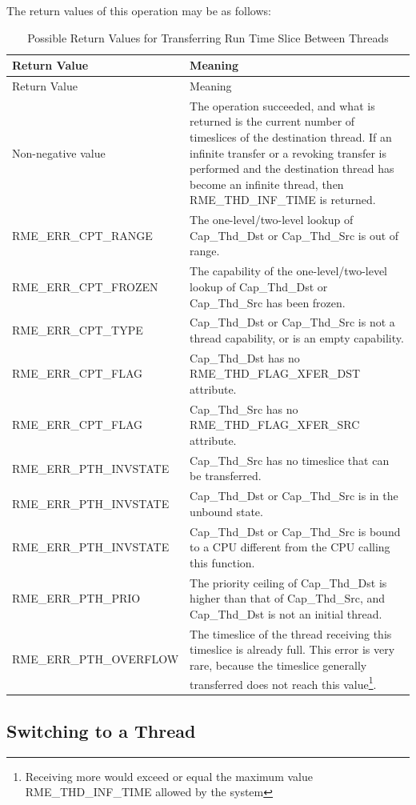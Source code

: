 The return values of this operation may be as follows:

\begin{xltabular}{\textwidth}{@{}>{\hsize\raggedright\arraybackslash}X>{\hsize\raggedright\arraybackslash}X@{}}
\caption{Possible Return Values for Transferring Run Time Slice Between Threads}\label{tab:4-35-transfer-run-time-slice-between-threads-return-values}\\
\toprule
Return Value & Meaning\tabularnewline
\endfirsthead
\toprule
Return Value & Meaning\tabularnewline
\midrule
\endhead
\bottomrule
\endlastfoot
    Non-negative value & The operation succeeded, and what is returned is the current number of timeslices of the destination thread. If an infinite transfer or a revoking transfer is performed and the destination thread has become an infinite thread, then RME\_THD\_INF\_TIME is returned.\tabularnewline
    RME\_ERR\_CPT\_RANGE & The one-level/two-level lookup of Cap\_Thd\_Dst or Cap\_Thd\_Src is out of range.\tabularnewline
    RME\_ERR\_CPT\_FROZEN & The capability of the one-level/two-level lookup of Cap\_Thd\_Dst or Cap\_Thd\_Src has been frozen.\tabularnewline
    RME\_ERR\_CPT\_TYPE & Cap\_Thd\_Dst or Cap\_Thd\_Src is not a thread capability, or is an empty capability.\tabularnewline
    RME\_ERR\_CPT\_FLAG & Cap\_Thd\_Dst has no RME\_THD\_FLAG\_XFER\_DST attribute.\tabularnewline
    RME\_ERR\_CPT\_FLAG & Cap\_Thd\_Src has no RME\_THD\_FLAG\_XFER\_SRC attribute.\tabularnewline
    RME\_ERR\_PTH\_INVSTATE & Cap\_Thd\_Src has no timeslice that can be transferred.\tabularnewline
    RME\_ERR\_PTH\_INVSTATE & Cap\_Thd\_Dst or Cap\_Thd\_Src is in the unbound state.\tabularnewline
    RME\_ERR\_PTH\_INVSTATE & Cap\_Thd\_Dst or Cap\_Thd\_Src is bound to a CPU different from the CPU calling this function.\tabularnewline
    RME\_ERR\_PTH\_PRIO & The priority ceiling of Cap\_Thd\_Dst is higher than that of Cap\_Thd\_Src, and Cap\_Thd\_Dst is not an initial thread.\tabularnewline
    RME\_ERR\_PTH\_OVERFLOW & The timeslice of the thread receiving this timeslice is already full. This error is very rare, because the timeslice generally transferred does not reach this value\footnote{Receiving more would exceed or equal the maximum value RME\_THD\_INF\_TIME allowed by the system}.\tabularnewline
\end{xltabular}
\nopagebreak[4]

\subsection{Switching to a Thread}\label{subsec:4-switch-to-a-thread}
\nopagebreak[4]

